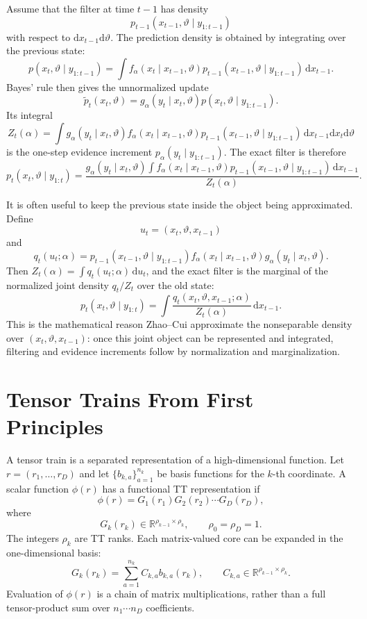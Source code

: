 \documentclass[11pt]{article}
\newcommand{\dd}{\mathrm{d}}
\newcommand{\R}{\mathbb{R}}
\theoremstyle{definition}
\theoremstyle{remark}
\begin{document}
Assume that the filter at time \(t-1\) has density
\[
  p_{t-1}(x_{t-1},\vartheta\mid y_{1:t-1})
\]
with respect to \(\dd x_{t-1}\dd\vartheta\).  The prediction density is obtained
by integrating over the previous state:
\[
  p(x_t,\vartheta\mid y_{1:t-1})
  =
  \int
  f_\alpha(x_t\mid x_{t-1},\vartheta)
  p_{t-1}(x_{t-1},\vartheta\mid y_{1:t-1})
  \,\dd x_{t-1}.
  \label{eq:p12-prediction}
\]
Bayes' rule then gives the unnormalized update
\[
  \tilde p_t(x_t,\vartheta)
  =
  g_\alpha(y_t\mid x_t,\vartheta)
  p(x_t,\vartheta\mid y_{1:t-1}).
\]
Its integral
\[
  Z_t(\alpha)
  =
  \int
  g_\alpha(y_t\mid x_t,\vartheta)
  f_\alpha(x_t\mid x_{t-1},\vartheta)
  p_{t-1}(x_{t-1},\vartheta\mid y_{1:t-1})
  \,\dd x_{t-1}\dd x_t\dd\vartheta
  \label{eq:p12-exact-evidence-increment}
\]
is the one-step evidence increment \(p_\alpha(y_t\mid y_{1:t-1})\).  The exact
filter is therefore
\[
  p_t(x_t,\vartheta\mid y_{1:t})
  =
  \frac{
  g_\alpha(y_t\mid x_t,\vartheta)
  \int f_\alpha(x_t\mid x_{t-1},\vartheta)
  p_{t-1}(x_{t-1},\vartheta\mid y_{1:t-1})\,\dd x_{t-1}
  }
  {Z_t(\alpha)}.
  \label{eq:p12-exact-filter}
\]

It is often useful to keep the previous state inside the object being
approximated.  Define
\[
  u_t=(x_t,\vartheta,x_{t-1})
\]
and
\[
  q_t(u_t;\alpha)
  =
  p_{t-1}(x_{t-1},\vartheta\mid y_{1:t-1})
  f_\alpha(x_t\mid x_{t-1},\vartheta)
  g_\alpha(y_t\mid x_t,\vartheta).
  \label{eq:p12-exact-joint-q}
\]
Then \(Z_t(\alpha)=\int q_t(u_t;\alpha)\,\dd u_t\), and the exact filter is
the marginal of the normalized joint density \(q_t/Z_t\) over the old state:
\[
  p_t(x_t,\vartheta\mid y_{1:t})
  =
  \int
  \frac{q_t(x_t,\vartheta,x_{t-1};\alpha)}{Z_t(\alpha)}
  \,\dd x_{t-1}.
  \label{eq:p12-exact-filter-marginal}
\]
This is the mathematical reason Zhao--Cui approximate the nonseparable density
over \((x_t,\vartheta,x_{t-1})\): once this joint object can be represented and
integrated, filtering and evidence increments follow by normalization and
marginalization.

\section{Tensor Trains From First Principles}

A tensor train is a separated representation of a high-dimensional function.
Let \(r=(r_1,\ldots,r_D)\) and let \(\{b_{k,a}\}_{a=1}^{n_k}\) be basis
functions for the \(k\)-th coordinate.  A scalar function \(\phi(r)\) has a
functional TT representation if
\[
  \phi(r)
  =
  G_1(r_1)G_2(r_2)\cdots G_D(r_D),
  \label{eq:p12-tt-evaluation}
\]
where
\[
  G_k(r_k)\in\R^{\rho_{k-1}\times\rho_k},\qquad
  \rho_0=\rho_D=1.
\]
The integers \(\rho_k\) are TT ranks.  Each matrix-valued core can be expanded
in the one-dimensional basis:
\[
  G_k(r_k)
  =
  \sum_{a=1}^{n_k} C_{k,a} b_{k,a}(r_k),
  \qquad
  C_{k,a}\in\R^{\rho_{k-1}\times\rho_k}.
  \label{eq:p12-core-expansion}
\]
Evaluation of \(\phi(r)\) is a chain of matrix multiplications, rather than a
full tensor-product sum over \(n_1\cdots n_D\) coefficients.
\end{document}
